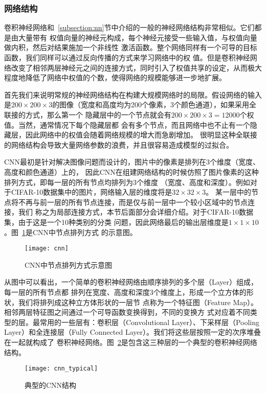 \subsubsection{网络结构}

卷积神经网络和~\ref{subsection:nn}节中介绍的一般的神经网络结构非常相似。它们都是由大量带有
权值向量的神经元构成，每个神经元接受一些输入值，与权值向量做内积，然后对结果施加一个非线性
激活函数。整个网络同样有一个可导的目标函数，我们同样可以通过反向传播的方式来学习网络中的权
值。但是卷积神经网络改变了相邻两层神经元之间的连接方式，同时引入了权值共享的设定，从而极大
程度地降低了网络中权值的个数，使得网络的规模能够进一步地扩展。

首先我们来说明常规的神经网络结构在构建大规模网络时的局限。假设网络的输入是$200\times 200 
\times 3$的图像（宽度和高度均为200个像素，3个颜色通道），如果采用全联接的方式，那么第一个
隐藏层中的一个节点就会有$200\times 200\times 3=12000$个权值。当然，通常情况下每个隐藏层都
会有多个节点，而且网络中也不止有一个隐藏层，因此网络中的权值会随着网络规模的增大而急剧增加。
很明显这种全联接的网络结构会导致大量网络参数的浪费，并且很容易造成模型的过拟合。

CNN最初是针对解决图像问题而设计的，图片中的像素是排列在3个维度（宽度、高度和颜色通道）上的，
因此CNN在组建网络结构的时候仿照了图片像素的这种排列方式，即每一层的所有节点均排列为3个维度
（宽度、高度和深度）。例如对于CIFAR-10数据集中的图片，网络输入层的维度将是$32\times 32\times3$。
某一层中的节点将不再与前一层的所有节点连接，而是仅与前一层中一个较小区域中的节点连接，我们
称之为局部连接方式，本节后面部分会详细介绍。对于CIFAR-10数据集，由于这是一个10种类别的分类
问题，因此网络最后的输出层维度是$1\times 1\times 10$。图~\ref{fig:cnn}是CNN中节点排列方式
的示意图。
\begin{figure}[ht]
  \centering%
  \texttt{[image: cnn]}
  \caption{CNN中节点排列方式示意图}
  \label{fig:cnn}
\end{figure}

从图中可以看出，一个简单的卷积神经网络由顺序排列的多个层（Layer）组成，每一层的所有节点都
排列在宽度、高度和深度3个维度上，形成一个立方体的形状，我们将排列成这种立方体形状的一层节
点称为一个特征图（Feature Map）。相邻两层特征图之间通过一个可导函数变换得到，不同的变换方
式对应着不同类型的层。最常用的一些层有：卷积层（Convolutional Layer）、下采样层（Pooling
 Layer）和全连接层（Fully Connected Layer）。我们将这些层按照一定的次序堆叠在一起就构成了
 卷积神经网络。图~\ref{fig:cnn_typical}是包含这三种层的一个典型的卷积神经网络结构。
\begin{figure}[ht]
  \centering%
  \texttt{[image: cnn\_typical]}
  \caption{典型的CNN结构}
  \label{fig:cnn_typical}
\end{figure}

